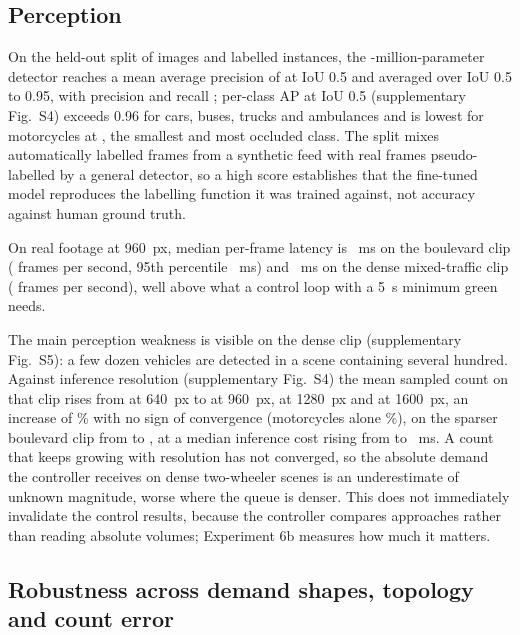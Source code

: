\documentclass[journal]{IEEEtran}
\begin{document}
\subsection{Perception}
\label{sec:perception}

On the held-out split of \DetValImages{} images and \DetValInstances{} labelled instances, the
\DetParams-million-parameter detector reaches a mean average precision of \DetMapFifty{} at IoU 0.5 and
\DetMapFiftyNinetyFive{} averaged over IoU 0.5 to 0.95, with precision \DetPrecision{} and recall
\DetRecall{}; per-class AP at IoU 0.5 (supplementary Fig.~S4) exceeds
0.96 for cars, buses, trucks and ambulances and is lowest for motorcycles at \DetApMotorcycle, the smallest
and most occluded class. The split mixes automatically labelled frames from a synthetic feed with real frames
pseudo-labelled by a general detector, so a high score establishes that the fine-tuned model reproduces the
labelling function it was trained against, not accuracy against human ground truth.

On real footage at 960~px, median per-frame latency is \LatLevMedian~ms on the boulevard clip (\LatLevFps{}
frames per second, 95th percentile \LatLevPNinetyFive~ms) and \LatHcmcMedian~ms on the dense mixed-traffic
clip (\LatHcmcFps{} frames per second), well above what a control loop with a 5~s minimum green needs.

The main perception weakness is visible on the dense clip (supplementary Fig.~S5): a few dozen vehicles are
detected in a scene containing several hundred. Against inference resolution (supplementary Fig.~S4) the
mean sampled count on that clip rises from \ResHcmcSixFourZero{} at 640~px to \ResHcmcNineSixZero{} at
960~px, \ResHcmcOneTwoEightZero{} at 1280~px and \ResHcmcOneSixZeroZero{} at 1600~px, an increase of
\ResHcmcRisePct\% with no sign of convergence (motorcycles alone \ResHcmcMotoRisePct\%), on the sparser
boulevard clip from \ResLevSixFourZero{} to \ResLevOneSixZeroZero, at a median inference cost rising from
\ResHcmcMsSixFourZero{} to \ResHcmcMsOneSixZeroZero~ms. A count that keeps growing with resolution has not
converged, so the absolute demand the controller receives on dense two-wheeler scenes is an underestimate of
unknown magnitude, worse where the queue is denser. This does not immediately invalidate the control
results, because the controller compares approaches rather than reading absolute volumes; Experiment 6b
measures how much it matters.

\subsection{Robustness across demand shapes, topology and count error}
\label{sec:robustness}
\end{document}
